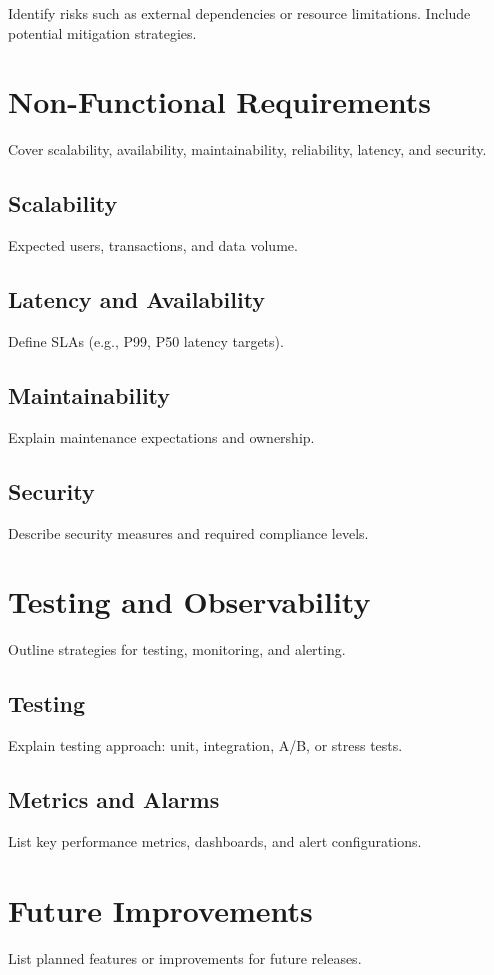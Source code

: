 \documentclass[12pt,a4paper]{article}
\begin{document}
Identify risks such as external dependencies or resource limitations.  
Include potential mitigation strategies.

\newpage
\section{Non-Functional Requirements}
Cover scalability, availability, maintainability, reliability, latency, and security.

\subsection{Scalability}
Expected users, transactions, and data volume.

\subsection{Latency and Availability}
Define SLAs (e.g., P99, P50 latency targets).

\subsection{Maintainability}
Explain maintenance expectations and ownership.

\subsection{Security}
Describe security measures and required compliance levels.

\newpage
\section{Testing and Observability}
Outline strategies for testing, monitoring, and alerting.

\subsection{Testing}
Explain testing approach: unit, integration, A/B, or stress tests.

\subsection{Metrics and Alarms}
List key performance metrics, dashboards, and alert configurations.

\newpage
\section{Future Improvements}
List planned features or improvements for future releases.
\end{document}
